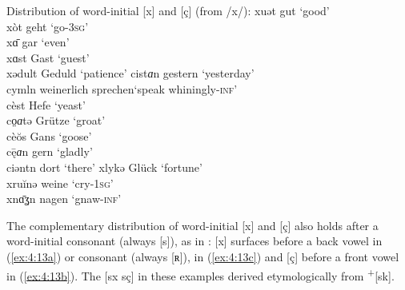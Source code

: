 \ea%
Distribution of word-initial [x] and [ç] (from /x/):\label{ex:4:12}
\ea\label{ex:4:12a}  xuət              \tab [xuət]    \tab gut                 \tab‘good’              \\
     xòt               \tab [xɔt]     \tab geht                \tab‘go-\textsc{3sg}’ \\
     xɑ̄                \tab [xɑː]     \tab gar                 \tab‘even’              \\
     xɑst              \tab [xɑst]    \tab Gast                \tab‘guest’             \\
     xədult            \tab [xədʊlt]  \tab Geduld              \tab‘patience’          
\ex\label{ex:4:12b}  cist\textit{ɑ}n   \tab [çɪstɐn]  \tab gestern             \tab‘yesterday’         \\
     cymln             \tab [çʏml̩n]  \tab  weinerlich sprechen\tab ‘speak whiningly-\textsc{inf}’\\
     cèst              \tab [çɛst]    \tab Hefe                \tab‘yeast’                         \\
     co̤\textit{ɑ}tə   \tab  [çœɐtə]  \tab  Grütze             \tab ‘groat’                      \\
     cèŏs              \tab [çɛɔs]    \tab Gans                \tab‘goose’                         \\
     c\={ę}\textit{ɑ}n \tab [çɛːɐn]   \tab gern                \tab‘gladly’                       \\
     ciəntn            \tab [çiəntn̩] \tab  dort               \tab ‘there’                       
\ex\label{ex:4:12c}   xlykə            \tab [xlʏkə]   \tab Glück               \tab‘fortune’                      \\
      xruĭnə           \tab [xʀuinə]  \tab weine               \tab‘cry\textsc{{}-1sg}’     \\
      xnɑ̄ʓn            \tab [xnɑːɣn̩] \tab  nagen              \tab ‘gnaw\textsc{{}-inf}’   
\z
\z 

The complementary distribution of word-initial [x] and [ç] also holds after a word-initial consonant (always [s]), as in : [x] surfaces before a back vowel in (\ref{ex:4:13a}) or consonant (always [ʀ]), in (\ref{ex:4:13c}) and [ç] before a front vowel in (\ref{ex:4:13b}). The [sx sç] in these examples derived etymologically from  \textsuperscript{+}[sk].

